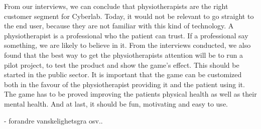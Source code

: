 From our interviews, we can conclude that physiotherapists are the right customer segment for Cyberlab. Today, it would not be relevant to go straight to the end user, because they are not familiar with this kind of technology. A physiotherapist is a professional who the patient can trust. If a professional say something, we are likely to believe in it. From the interviews conducted, we also found that the best way to get the physiotherapists attention will be to run a pilot project, to test the product and show the game's effect. This should be started in the public sector. It is important that the game can be customized both in the favour of the physiotherapist providing it and the patient using it. The game has to be proved improving the patients physical health as well as their mental health. And at last, it should be fun, motivating and easy to use. 

- forandre vanskelighetsgra osv..